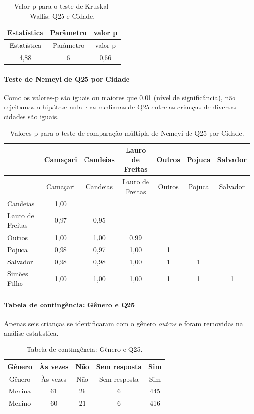 \documentclass[]{article}
\let\oldparagraph\paragraph
\renewcommand{\paragraph}[1]{\oldparagraph{#1}\mbox{}}
\begin{document}
\begin{longtable}[]{@{}ccc@{}}
\caption{\label{tab:unnamed-chunk-669}Valor-p para o teste de Kruskal-Wallis: Q25 e Cidade.}\tabularnewline
\toprule
Estatística & Parâmetro & valor p\tabularnewline
\midrule
\endfirsthead
\toprule
Estatística & Parâmetro & valor p\tabularnewline
\midrule
\endhead
4,88 & 6 & 0,56\tabularnewline
\bottomrule
\end{longtable}

\hypertarget{teste-de-nemeyi-de-q25-por-cidade}{%
\paragraph{Teste de Nemeyi de Q25 por Cidade}\label{teste-de-nemeyi-de-q25-por-cidade}}

Como os valores-p são iguais ou maiores que 0.01 (nível de significância), não rejeitamos a hipótese nula e as medianas de Q25 entre as crianças de diversas cidades são iguais.

\begin{longtable}[]{@{}lcccccc@{}}
\caption{\label{tab:unnamed-chunk-671}Valores-p para o teste de comparação múltipla de Nemeyi de Q25 por Cidade.}\tabularnewline
\toprule
& Camaçari & Candeias & Lauro de Freitas & Outros & Pojuca & Salvador\tabularnewline
\midrule
\endfirsthead
\toprule
& Camaçari & Candeias & Lauro de Freitas & Outros & Pojuca & Salvador\tabularnewline
\midrule
\endhead
Candeias & 1,00 & & & & &\tabularnewline
Lauro de Freitas & 0,97 & 0,95 & & & &\tabularnewline
Outros & 1,00 & 1,00 & 0,99 & & &\tabularnewline
Pojuca & 0,98 & 0,97 & 1,00 & 1 & &\tabularnewline
Salvador & 0,98 & 0,98 & 1,00 & 1 & 1 &\tabularnewline
Simões Filho & 1,00 & 1,00 & 1,00 & 1 & 1 & 1\tabularnewline
\bottomrule
\end{longtable}

\cleardoublepage

\hypertarget{tabela-de-continguxeancia-guxeanero-e-q25}{%
\paragraph{Tabela de contingência: Gênero e Q25}\label{tabela-de-continguxeancia-guxeanero-e-q25}}

Apenas seis crianças se identificaram com o gênero \emph{outros} e foram removidas na análise estatística.

\begin{longtable}[]{@{}ccccc@{}}
\caption{\label{tab:unnamed-chunk-672}Tabela de contingência: Gênero e Q25.}\tabularnewline
\toprule
Gênero & Às vezes & Não & Sem resposta & Sim\tabularnewline
\midrule
\endfirsthead
\toprule
Gênero & Às vezes & Não & Sem resposta & Sim\tabularnewline
\midrule
\endhead
Menina & 61 & 29 & 6 & 445\tabularnewline
Menino & 60 & 21 & 6 & 416\tabularnewline
\bottomrule
\end{longtable}
\end{document}
